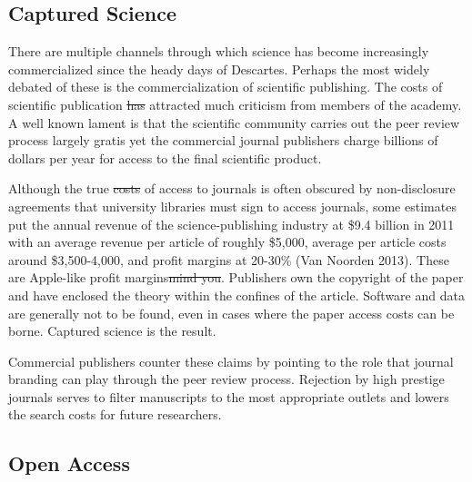 \documentclass{article}
\providecommand{\DIFadd}[1]{{\protect\color{blue}\uwave{#1}}} %
\providecommand{\DIFdel}[1]{{\protect\color{red}\sout{#1}}}                      %
\providecommand{\DIFaddbegin}{} %
\providecommand{\DIFaddend}{} %
\providecommand{\DIFdelbegin}{} %
\providecommand{\DIFdelend}{} %
\begin{document}
\subsection{Captured Science}\label{captured-science}

There are multiple channels through which science has become
increasingly commercialized since the heady days of Descartes. Perhaps
the most widely debated of these is the commercialization of scientific
publishing. The costs of scientific publication \DIFdelbegin \DIFdel{has }\DIFdelend \DIFaddbegin \DIFadd{have }\DIFaddend attracted much
criticism from members of the academy. A well known lament is that the
scientific community carries out the peer review process largely gratis
yet the commercial journal publishers charge billions of dollars per
year for access to the final scientific product.

Although the true \DIFdelbegin \DIFdel{costs }\DIFdelend \DIFaddbegin \DIFadd{cost }\DIFaddend of access to journals is often obscured by
non-disclosure agreements that university libraries must sign to access
journals, some estimates put the annual revenue of the
science-publishing industry at \$9.4 billion in 2011 with an average
revenue per article of roughly \$5,000, average per article costs around
\$3,500-4,000, and profit margins at 20-30\% ({Van Noorden} 2013). These
are Apple-like profit margins\DIFdelbegin \DIFdel{mind you}\DIFdelend . Publishers own the copyright of the paper
and have enclosed the theory within the confines of the article.
Software and data are generally not to be found, even in cases where the
paper access costs can be borne. Captured science is the result.

Commercial publishers counter these claims by pointing to the role that
journal branding can play through the peer review process. Rejection by
high prestige journals serves to filter manuscripts to the most
appropriate outlets and lowers the search costs for future researchers.

\subsection{Open Access}\label{open-access}
\end{document}
